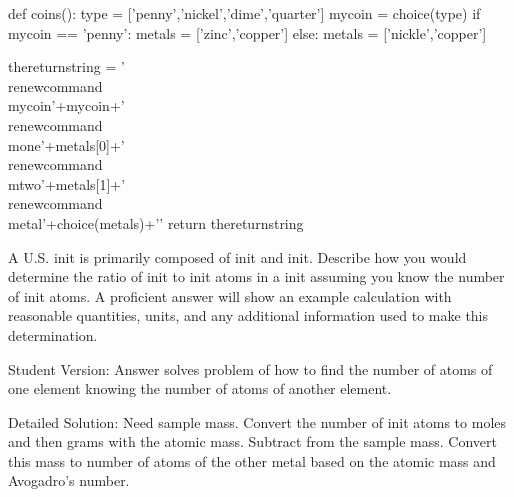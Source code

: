
\begin{pycode}

def coins():
	type = ['penny','nickel','dime','quarter']
	mycoin = choice(type)
	if mycoin == 'penny':
		metals = ['zinc','copper']
	else:
		metals = ['nickle','copper']
	
	thereturnstring = '\\renewcommand{\\mycoin}{'+mycoin+'} \
	\\renewcommand{\\mone}{'+metals[0]+'} \
	\\renewcommand{\\mtwo}{'+metals[1]+'} \
	\\renewcommand{\\metal}{'+choice(metals)+'}'
	return thereturnstring

\end{pycode}

\providecommand{\mycoin}{init}
\providecommand{\mone}{init}
\providecommand{\mtwo}{init}
\providecommand{\metal}{init} 


A U.S. \mycoin{} is primarily composed of \mone{} and \mtwo{}. Describe how you would determine the ratio of \mone{} to \mtwo{} atoms in a \mycoin{} assuming you know the number of \mone{} atoms. A proficient answer will show an example calculation with reasonable quantities, units, and any additional information used to make this determination.

\begin{solution}

Student Version: Answer solves problem of how to find the number of atoms of one element knowing the number of atoms of another element. 

\ifgradingnotes
Detailed Solution: Need sample mass. Convert the number of \metal{} atoms to moles and then grams with the atomic mass. Subtract from the sample mass. Convert this mass to number of atoms of the other metal based on the atomic mass and Avogadro's number. 
\fi
\end{solution}



